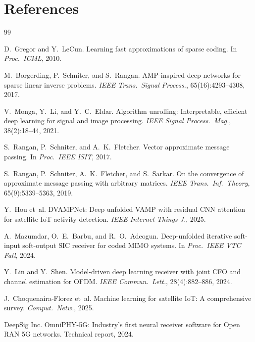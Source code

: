 \documentclass{article}
\begin{document}
\section*{References}
{\small
\begin{thebibliography}{99}

D.~Gregor and Y.~LeCun.
\newblock Learning fast approximations of sparse coding.
\newblock In \emph{Proc.\ ICML}, 2010.

M.~Borgerding, P.~Schniter, and S.~Rangan.
\newblock AMP-inspired deep networks for sparse linear inverse problems.
\newblock \emph{IEEE Trans.\ Signal Process.}, 65(16):4293--4308, 2017.

V.~Monga, Y.~Li, and Y.~C.~Eldar.
\newblock Algorithm unrolling: Interpretable, efficient deep learning for signal and image processing.
\newblock \emph{IEEE Signal Process.\ Mag.}, 38(2):18--44, 2021.

S.~Rangan, P.~Schniter, and A.~K.~Fletcher.
\newblock Vector approximate message passing.
\newblock In \emph{Proc.\ IEEE ISIT}, 2017.

S.~Rangan, P.~Schniter, A.~K.~Fletcher, and S.~Sarkar.
\newblock On the convergence of approximate message passing with arbitrary matrices.
\newblock \emph{IEEE Trans.\ Inf.\ Theory}, 65(9):5339--5363, 2019.

Y.~Hou et~al.
\newblock DVAMPNet: Deep unfolded VAMP with residual CNN attention for satellite IoT activity detection.
\newblock \emph{IEEE Internet Things J.}, 2025.

A.~Mazumdar, O.~E.~Barbu, and R.~O.~Adeogun.
\newblock Deep-unfolded iterative soft-input soft-output SIC receiver for coded MIMO systems.
\newblock In \emph{Proc.\ IEEE VTC Fall}, 2024.

Y.~Lin and Y.~Shen.
\newblock Model-driven deep learning receiver with joint CFO and channel estimation for OFDM.
\newblock \emph{IEEE Commun.\ Lett.}, 28(4):882--886, 2024.

J.~Choquenaira-Florez et~al.
\newblock Machine learning for satellite IoT: A comprehensive survey.
\newblock \emph{Comput.\ Netw.}, 2025.

DeepSig Inc.
\newblock OmniPHY-5G: Industry's first neural receiver software for Open RAN 5G networks.
\newblock Technical report, 2024.


\end{thebibliography}}
\end{document}
